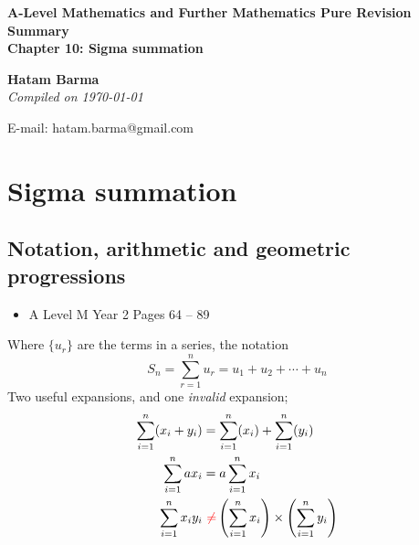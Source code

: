 \documentclass[11pt, a4paper]{article}
\begin{document}
\begin{titlepage}
   \begin{center}
       \vspace*{2.5cm}
	\huge
       \textbf{A-Level Mathematics and Further Mathematics Pure Revision Summary} \\
	\vspace{1cm}
	\Large
       \textbf{Chapter 10: Sigma summation}
            
       \vspace{1.5cm}
	\LARGE
       \textbf{Hatam Barma} \\
	\vspace{0.75cm}
       \normalsize
       \emph{Compiled on \Datea\today} \\

       \vfill
        

	E-mail: hatam.barma@gmail.com
   \end{center}
\end{titlepage}


\tableofcontents

\clearpage
\section{Sigma summation}
\vspace{0.5cm}


\subsection{Notation, arithmetic and geometric progressions}
\begin{itemize}
\item A Level M Year 2 \hspace{1cm} \phantom{ AS / } Pages 64 -- 89
\end{itemize} \par
Where $\{u_{r}\}$ are the terms in a series, the notation
\begin{equation*}
S_{n}=\sum_{r=1}^{n}u_{r}=u_{1}+u_{2}+\cdots+u_{n}
\end{equation*}
Two useful expansions, and one \emph{invalid} expansion;
\begin{align*}
\sum_{i=1}^{n}(x_{i}+y_{i})&=\sum_{i=1}^{n}(x_{i})+\sum_{i=1}^{n}(y_{i}) \\
\sum_{i=1}^{n}ax_{i}&=a\sum_{i=1}^{n}x_{i} \\
\sum_{i=1}^{n}x_{i}y_{i}&\,\textcolor{red}{\,\neq}\left(\sum_{i=1}^{n}x_{i}\right)\times\left(\sum_{i=1}^{n}y_{i}\right)
\end{align*} \newline \par
\end{document}
